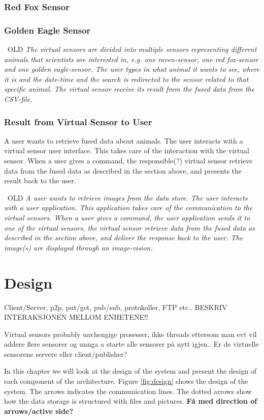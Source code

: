 \documentclass[USenglish]{uit-thesis}
\begin{document}
\subsection{Red Fox Sensor}
\subsection{Golden Eagle Sensor}

\ OLD
\textit{The virtual sensors are divided into multiple sensors representing different animals that scientists are interested in, e.g. one raven-sensor, one red fox-sensor and one golden eagle-sensor.
The user types in what animal it wants to see, where it is and the date-time and the search is redirected to the sensor related to that specific animal. The virtual sensor receive its result from the fused data from the CSV-file.}

\subsection{Result from Virtual Sensor to User}
A user wants to retrieve fused data about animals. The user interacts with a virtual sensor user interface. This takes care of the interaction with the virtual sensor. When a user gives a command, the responsible(?) virtual sensor retrieve data from the fused data as described in the section above, and presents the result back to the user.

\ OLD
\textit{A user wants to retrieve images from the data store.
The user interacts with a user application. This application takes care of the communication to the virtual sensors. When a user gives a command, the user application sends it to one of the virtual sensors, the virtual sensor retrieve data from the fused data as described in the section above, and deliver the response back to the user. The image(s) are displayed through an image-vision.}


\chapter{Design}
Client/Server, p2p, put/get, pub/sub, protokoller, FTP etc..
BESKRIV INTERAKSJONEN MELLOM ENHETENE!!

Virtual sensors probably uavhengige prosesser, ikke threads ettersom man evt vil addere flere sensorer og unnga a starte alle sensorer på nytt igjen..
Er de virtuelle sensorene servere eller client/publisher?

In this chapter we will look at the design of the system and present the design of each component of the architecture. Figure \ref{fig:design} shows the design of the system. The arrows indicates the communication lines. The dotted arrows show how the data storage is structured with files and pictures. \textbf{Få med direction of arrows/active side?}
\end{document}
